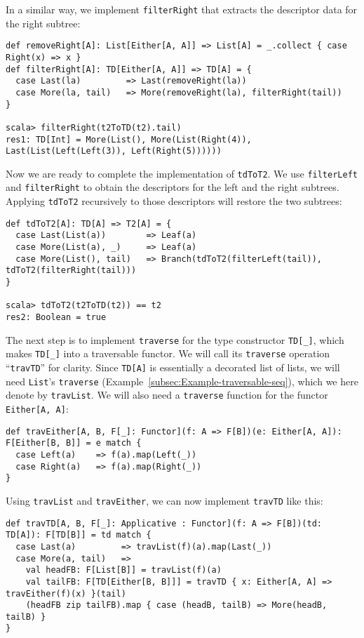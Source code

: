 In a similar way, we implement \lstinline!filterRight! that extracts
the descriptor data for the right subtree:
\begin{lstlisting}
def removeRight[A]: List[Either[A, A]] => List[A] = _.collect { case Right(x) => x }
def filterRight[A]: TD[Either[A, A]] => TD[A] = {
  case Last(la)         => Last(removeRight(la))
  case More(la, tail)   => More(removeRight(la), filterRight(tail))
}

scala> filterRight(t2ToTD(t2).tail)
res1: TD[Int] = More(List(), More(List(Right(4)), Last(List(Left(Left(3)), Left(Right(5))))))
\end{lstlisting}

Now we are ready to complete the implementation of \lstinline!tdToT2!.
We use \lstinline!filterLeft! and \lstinline!filterRight! to obtain
the descriptors for the left and the right subtrees. Applying \lstinline!tdToT2!
recursively to those descriptors will restore the two subtrees:
\begin{lstlisting}
def tdToT2[A]: TD[A] => T2[A] = {
  case Last(List(a))        => Leaf(a)
  case More(List(a), _)     => Leaf(a)
  case More(List(), tail)   => Branch(tdToT2(filterLeft(tail)), tdToT2(filterRight(tail)))
}

scala> tdToT2(t2ToTD(t2)) == t2
res2: Boolean = true
\end{lstlisting}

The next step is to implement \lstinline!traverse! for the type constructor
\lstinline!TD[_]!, which makes \lstinline!TD[_]! into a traversable
functor. We will call its \lstinline!traverse! operation \textsf{``}\lstinline!travTD!\textsf{''}
for clarity. Since \lstinline!TD[A]! is essentially a decorated list
of lists, we will need \lstinline!List!\textsf{'}s \lstinline!traverse! (Example~\ref{subsec:Example-traversable-seq}),
which we here denote by \lstinline!travList!. We will also need a
\lstinline!traverse! function for the functor \lstinline!Either[A, A]!:
\begin{lstlisting}
def travEither[A, B, F[_]: Functor](f: A => F[B])(e: Either[A, A]): F[Either[B, B]] = e match {
  case Left(a)    => f(a).map(Left(_))
  case Right(a)   => f(a).map(Right(_))
}
\end{lstlisting}
Using \lstinline!travList! and \lstinline!travEither!, we can now
implement \lstinline!travTD! like this:
\begin{lstlisting}
def travTD[A, B, F[_]: Applicative : Functor](f: A => F[B])(td: TD[A]): F[TD[B]] = td match {
  case Last(a)         => travList(f)(a).map(Last(_))
  case More(a, tail)   =>
    val headFB: F[List[B]] = travList(f)(a)
    val tailFB: F[TD[Either[B, B]]] = travTD { x: Either[A, A] => travEither(f)(x) }(tail)
    (headFB zip tailFB).map { case (headB, tailB) => More(headB, tailB) }
}
\end{lstlisting}

